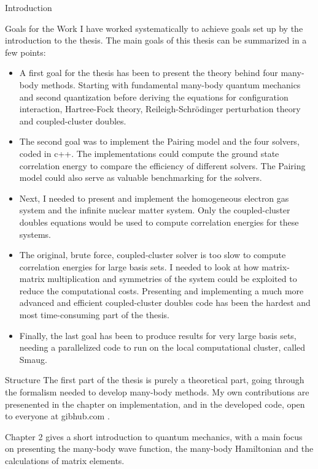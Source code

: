 \documentclass[twoside,english]{uiofysmaster}
\begin{document}
\begin{chapter}{Introduction}
	\begin{subsection}{Goals for the Work}
		I have worked systematically to achieve goals set up by the introduction to the thesis. The main goals of this thesis can be summarized in a few points: 
		\begin{itemize}
			\item A first goal for the thesis has been to present the theory behind four many-body methods. Starting with fundamental many-body quantum mechanics and second quantization before deriving the equations for configuration interaction, Hartree-Fock theory, Reileigh-Schr\"{o}dinger perturbation theory and coupled-cluster doubles. 
			\item The second goal was to implement the Pairing model and the four solvers, coded in c++. The implementations could compute the ground state correlation energy to compare the efficiency of different solvers. The Pairing model could also serve as valuable benchmarking for the solvers.
			\item Next, I needed to present and implement the homogeneous electron gas system and the infinite nuclear matter system. Only the coupled-cluster doubles equations would be used to compute correlation energies for these systems. 
			\item The original, brute force, coupled-cluster solver is too slow to compute correlation energies for large basis sets. I needed to look at how matrix-matrix multiplication and symmetries of the system could be exploited to reduce the computational costs. Presenting and implementing a much more advanced and efficient coupled-cluster doubles code has been the hardest and most time-consuming part of the thesis. 
			\item Finally, the last goal has been to produce results for very large basis sets, needing a parallelized code to run on the local computational cluster, called Smaug. 
		\end{itemize}
	\end{subsection}

	\begin{subsection}{Structure}
		The first part of the thesis is purely a theoretical part, going through the formalism needed to develop many-body methods. My own contributions are presenented in the chapter on implementation, and in the developed code, open to everyone at gibhub.com \cite{WholmenGithub}.

		Chapter 2 gives a short introduction to quantum mechanics, with a main focus on presenting the many-body wave function, the many-body Hamiltonian and the calculations of matrix elements. 


\end{subsection}
\end{chapter}
\end{document}
